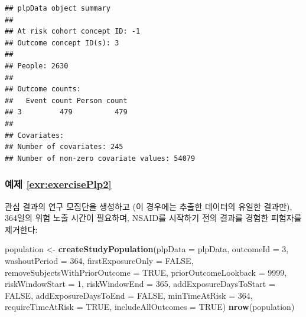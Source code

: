 \documentclass[10.5pt]{book}
\newenvironment{Shaded}{\begin{snugshade}}{\end{snugshade}}
\newcommand{\KeywordTok}[1]{\textcolor[rgb]{0.13,0.29,0.53}{\textbf{#1}}}
\newcommand{\DataTypeTok}[1]{\textcolor[rgb]{0.13,0.29,0.53}{#1}}
\newcommand{\DecValTok}[1]{\textcolor[rgb]{0.00,0.00,0.81}{#1}}
\newcommand{\StringTok}[1]{\textcolor[rgb]{0.31,0.60,0.02}{#1}}
\newcommand{\OtherTok}[1]{\textcolor[rgb]{0.56,0.35,0.01}{#1}}
\newcommand{\NormalTok}[1]{#1}
\theoremstyle{definition}
\theoremstyle{definition}
\theoremstyle{definition}
\theoremstyle{remark}
\begin{document}
\begin{verbatim}
## plpData object summary
## 
## At risk cohort concept ID: -1
## Outcome concept ID(s): 3
## 
## People: 2630
## 
## Outcome counts:
##   Event count Person count
## 3         479          479
## 
## Covariates:
## Number of covariates: 245
## Number of non-zero covariate values: 54079
\end{verbatim}

\subsubsection*{예제 \ref{exr:exercisePlp2}}\label{-refexrexerciseplp2}

관심 결과의 연구 모집단을 생성하고 (이 경우에는 추출한 데이터의 유일한
결과만), 364일의 위험 노출 시간이 필요하며, NSAID를 시작하기 전의 결과를
경험한 피험자를 제거한다:

\begin{Shaded}
\begin{Highlighting}[]
\NormalTok{population <-}\StringTok{ }\KeywordTok{createStudyPopulation}\NormalTok{(}\DataTypeTok{plpData =}\NormalTok{ plpData,}
                                    \DataTypeTok{outcomeId =} \DecValTok{3}\NormalTok{,}
                                    \DataTypeTok{washoutPeriod =} \DecValTok{364}\NormalTok{,}
                                    \DataTypeTok{firstExposureOnly =} \OtherTok{FALSE}\NormalTok{,}
                                    \DataTypeTok{removeSubjectsWithPriorOutcome =} \OtherTok{TRUE}\NormalTok{,}
                                    \DataTypeTok{priorOutcomeLookback =} \DecValTok{9999}\NormalTok{,}
                                    \DataTypeTok{riskWindowStart =} \DecValTok{1}\NormalTok{,}
                                    \DataTypeTok{riskWindowEnd =} \DecValTok{365}\NormalTok{,}
                                    \DataTypeTok{addExposureDaysToStart =} \OtherTok{FALSE}\NormalTok{,}
                                    \DataTypeTok{addExposureDaysToEnd =} \OtherTok{FALSE}\NormalTok{,}
                                    \DataTypeTok{minTimeAtRisk =} \DecValTok{364}\NormalTok{,}
                                    \DataTypeTok{requireTimeAtRisk =} \OtherTok{TRUE}\NormalTok{,}
                                    \DataTypeTok{includeAllOutcomes =} \OtherTok{TRUE}\NormalTok{)}
\KeywordTok{nrow}\NormalTok{(population)}
\end{Highlighting}
\end{Shaded}
\end{document}
